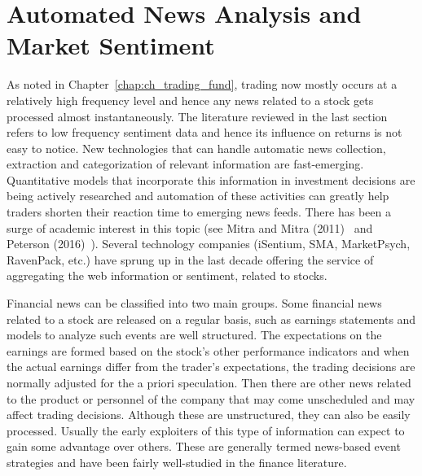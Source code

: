 \section{Automated News Analysis and Market Sentiment}\label{in:sentag1}


As noted in Chapter~\ref{chap:ch_trading_fund}, trading now mostly occurs at a relatively high frequency level and hence any news related to a stock gets processed almost instantaneously. The literature reviewed in the last section refers to low frequency sentiment data and hence its influence on returns is not easy to notice. New technologies that can handle automatic news collection, extraction and categorization of relevant information are fast-emerging. Quantitative models that incorporate this information in investment decisions are being actively researched and automation of these activities can greatly help traders shorten their reaction time to emerging news feeds. There has been a surge of academic interest in this topic (see Mitra and Mitra (2011)~\cite{mitra2} and Peterson (2016)~\cite{peterson}). Several technology companies (iSentium, SMA, MarketPsych, RavenPack, etc.) have sprung up in the last decade offering the service of aggregating the web information or sentiment, related to stocks. 


Financial news can be classified into two main groups. Some financial news related to a stock are released on a regular basis, such as earnings statements and models to analyze such events are well structured. The expectations on the earnings are formed based on the stock's other performance indicators and when the actual earnings differ from the trader's expectations, the trading decisions are normally adjusted for the a priori speculation. Then there are other news related to the product or personnel of the company that may come unscheduled and may affect trading decisions. Although these are unstructured, they can also be easily processed. Usually the early exploiters of this type of information can expect to gain some advantage over others. These are generally termed news-based event strategies and have been fairly well-studied in the finance literature. 


